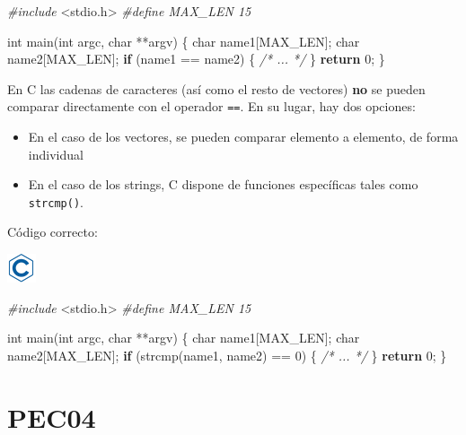 \documentclass[
]{book}
\newenvironment{Shaded}{\begin{snugshade}}{\end{snugshade}}
\newcommand{\CommentTok}[1]{\textcolor[rgb]{0.56,0.35,0.01}{\textit{#1}}}
\newcommand{\ControlFlowTok}[1]{\textcolor[rgb]{0.13,0.29,0.53}{\textbf{#1}}}
\newcommand{\DataTypeTok}[1]{\textcolor[rgb]{0.13,0.29,0.53}{#1}}
\newcommand{\DecValTok}[1]{\textcolor[rgb]{0.00,0.00,0.81}{#1}}
\newcommand{\ImportTok}[1]{#1}
\newcommand{\NormalTok}[1]{#1}
\newcommand{\PreprocessorTok}[1]{\textcolor[rgb]{0.56,0.35,0.01}{\textit{#1}}}
\providecommand{\tightlist}{%
  \setlength{\itemsep}{0pt}\setlength{\parskip}{0pt}}
\begin{document}
\begin{Shaded}
\begin{Highlighting}[]
\PreprocessorTok{\#include }\ImportTok{\textless{}stdio.h\textgreater{}}
\PreprocessorTok{\#define MAX\_LEN 15}

\DataTypeTok{int}\NormalTok{ main(}\DataTypeTok{int}\NormalTok{ argc, }\DataTypeTok{char}\NormalTok{ **argv) \{}
    \DataTypeTok{char}\NormalTok{ name1[MAX\_LEN];}
    \DataTypeTok{char}\NormalTok{ name2[MAX\_LEN];}
    \ControlFlowTok{if}\NormalTok{ (name1 == name2) \{}
        \CommentTok{/* ... */}
\NormalTok{    \}}
    \ControlFlowTok{return} \DecValTok{0}\NormalTok{;}
\NormalTok{\}}
\end{Highlighting}
\end{Shaded}

En C las cadenas de caracteres (así como el resto de vectores) \textbf{no} se pueden comparar directamente con el operador \texttt{==}. En su lugar, hay dos opciones:

\begin{itemize}
\tightlist
\item
  En el caso de los vectores, se pueden comparar elemento a elemento, de forma individual
\item
  En el caso de los strings, C dispone de funciones específicas tales como \texttt{strcmp()}.
\end{itemize}

Código correcto:

\includegraphics{./img/c.png}

\begin{Shaded}
\begin{Highlighting}[]
\PreprocessorTok{\#include }\ImportTok{\textless{}stdio.h\textgreater{}}
\PreprocessorTok{\#define MAX\_LEN 15}

\DataTypeTok{int}\NormalTok{ main(}\DataTypeTok{int}\NormalTok{ argc, }\DataTypeTok{char}\NormalTok{ **argv) \{}
    \DataTypeTok{char}\NormalTok{ name1[MAX\_LEN];}
    \DataTypeTok{char}\NormalTok{ name2[MAX\_LEN];}
    \ControlFlowTok{if}\NormalTok{ (strcmp(name1, name2) == }\DecValTok{0}\NormalTok{) \{}
        \CommentTok{/* ... */}
\NormalTok{    \}}
    \ControlFlowTok{return} \DecValTok{0}\NormalTok{;}
\NormalTok{\}}
\end{Highlighting}
\end{Shaded}

\hypertarget{pec04}{%
\chapter{PEC04}\label{pec04}}
\end{document}
